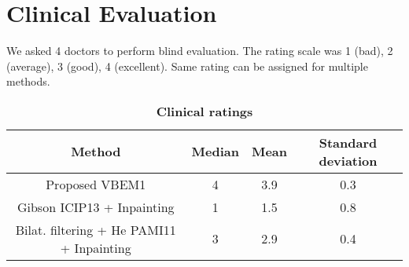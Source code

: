 \section{Clinical Evaluation}

We asked 4 doctors to perform blind evaluation. The rating scale was 1 (bad), 2 (average), 3 (good), 4 (excellent). Same rating can be assigned for multiple methods.

\begin{table}[h!]
    \centering
    \vspace{20pt}
    \setlength{\tabcolsep}{12pt}
    \renewcommand{\arraystretch}{1.4}
    \begin{tabular}{| c | c | c | c |}
        \hline
        \textbf{Method} & \textbf{Median} & \textbf{Mean} & \textbf{Standard deviation} \\
        \hline
        Proposed VBEM1 & 4 & 3.9 & 0.3 \\
        \hline
        Gibson ICIP13 + Inpainting & 1 & 1.5 & 0.8 \\
        \hline
        Bilat. filtering + He PAMI11 + Inpainting & 3 & 2.9 & 0.4 \\
        \hline
    \end{tabular}
    \caption{\bf Clinical ratings}
    \label{table:clinalratings}
\end{table}
